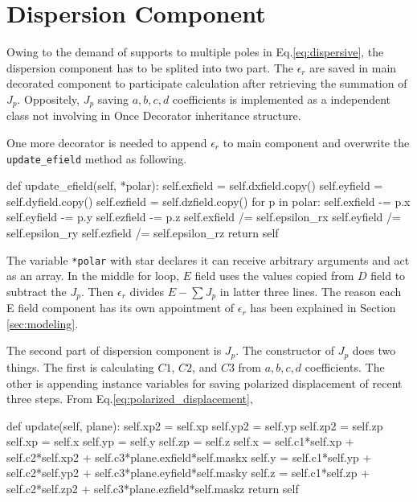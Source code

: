 \section{Dispersion Component}
Owing to the demand of supports to multiple poles in Eq.\ref{eq:dispersive}, the dispersion component has to be splited
into two part. The $\epsilon_r$ are saved in main decorated component to participate calculation after retrieving the
summation of $J_p$. Oppositely, $J_p$ saving $a,b,c,d$ coefficients is implemented as a independent class not involving
in Once Decorator inheritance structure.

One more decorator is needed to append $\epsilon_r$ to main component and overwrite the \texttt{update\_efield} method
as following. 
\begin{code}
    def update_efield(self, *polar):
        self.exfield  = self.dxfield.copy()
        self.eyfield  = self.dyfield.copy()
        self.ezfield  = self.dzfield.copy()
        for p in polar:
            self.exfield -= p.x
            self.eyfield -= p.y
            self.ezfield -= p.z
        self.exfield /= self.epsilon_rx
        self.eyfield /= self.epsilon_ry
        self.ezfield /= self.epsilon_rz
        return self
\end{code}
The variable \texttt{*polar} with star declares it can receive arbitrary arguments and act as an array. In the middle
for loop, $E$ field uses the values copied from $D$ field to subtract the $J_p$. Then $\epsilon_r$ divides $E - \sum
J_p$ in latter three lines. The reason each E field component has its own appointment of $\epsilon_{r}$ has been
explained in Section \ref{sec:modeling}.

The second part of dispersion component is $J_p$. The constructor of $J_p$ does two things. The first is calculating
$C1$, $C2$, and $C3$ from $a,b,c,d$ coefficients. The other is appending instance variables for saving polarized
displacement of recent three steps. From Eq.\ref{eq:polarized_displacement}, 
\begin{code}
    def update(self, plane):
        self.xp2 = self.xp
        self.yp2 = self.yp
        self.zp2 = self.zp
        self.xp = self.x
        self.yp = self.y
        self.zp = self.z
        self.x = self.c1*self.xp + self.c2*self.xp2 + self.c3*plane.exfield*self.maskx
        self.y = self.c1*self.yp + self.c2*self.yp2 + self.c3*plane.eyfield*self.masky
        self.z = self.c1*self.zp + self.c2*self.zp2 + self.c3*plane.ezfield*self.maskz
        return self
\end{code}

